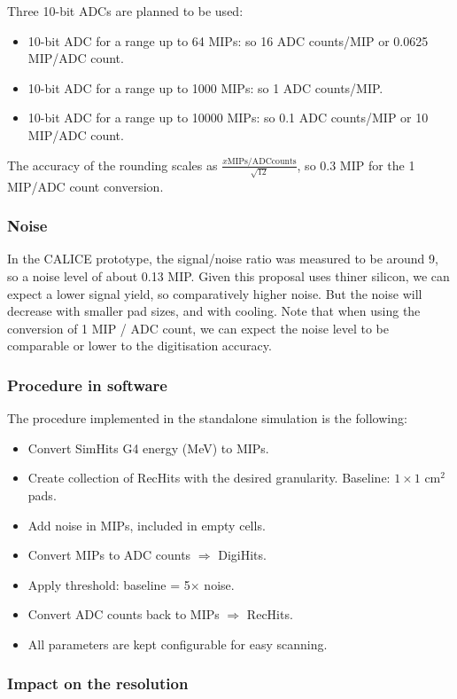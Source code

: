 Three 10-bit ADCs are planned to be used:
\begin{itemize}
\item 10-bit ADC for a range up to 64 MIPs: so 16 ADC counts/MIP or 0.0625 MIP/ADC count.
\item 10-bit ADC for a range up to 1000 MIPs: so 1 ADC counts/MIP.
\item 10-bit ADC for a range up to 10000 MIPs: so 0.1 ADC counts/MIP or 10 MIP/ADC count.
\end{itemize}

The accuracy of the rounding scales as $\frac{x\mathrm{MIPs/ADC
    counts}}{\sqrt{12}}$, so 0.3 MIP for the 1 MIP/ADC count
conversion.

\subsubsection{Noise}

In the CALICE prototype, the signal/noise ratio was measured to be
around 9, so a noise level of about 0.13 MIP. Given this proposal uses
thiner silicon, we can expect a lower signal yield, so comparatively
higher noise. But the noise will decrease with smaller pad sizes, and
with cooling. Note that when using the conversion of 1 MIP / ADC
count, we can expect the noise level to be comparable or lower to the
digitisation accuracy.


\subsubsection{Procedure in software}

The procedure implemented in the standalone simulation is the following:
\begin{itemize}
\item Convert SimHits G4 energy (MeV) to MIPs.
\item Create collection of RecHits with the desired granularity. Baseline: $1 \times 1$ cm$^2$ pads.
\item Add noise in MIPs, included in empty cells.
\item Convert MIPs to ADC counts $\Rightarrow$ DigiHits.
\item Apply threshold: baseline = 5$\times$ noise.
\item Convert ADC counts back to MIPs $\Rightarrow$ RecHits.
\item All parameters are kept configurable for easy scanning.
\end{itemize}

\subsubsection{Impact on the resolution}

